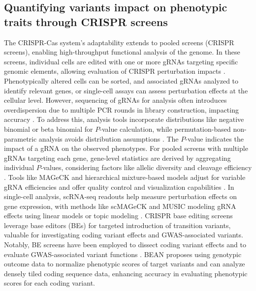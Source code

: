 \documentclass[a4paper, titlepage, openright]{book}
\begin{document}
\subsection{Quantifying variants impact on phenotypic traits through CRISPR screens}
The CRISPR-Cas system's adaptability extends to pooled screens (CRISPR screens), enabling high-throughput functional analysis of the genome. In these screens, individual cells are edited with one or more gRNAs targeting specific genomic elements, allowing evaluation of CRISPR perturbation impacts \citep{doench2018ready}. Phenotypically altered cells can be sorted, and associated gRNAs analyzed to identify relevant genes, or single-cell assays can assess perturbation effects at the cellular level. However, sequencing of gRNAs for analysis often introduces overdispersion due to multiple PCR rounds in library construction, impacting accuracy \citep{clement2020technologies}. To address this, analysis tools incorporate distributions like negative binomial or beta binomial for $P$-value calculation, while permutation-based non-parametric analysis avoids distribution assumptions \citep{spahn2017pinapl,jeong2019beta,jia2017permutation}. The $P$-value indicates the impact of a gRNA on the observed phenotypes. For pooled screens with multiple gRNAs targeting each gene, gene-level statistics are derived by aggregating individual $P$-values, considering factors like allelic diversity and cleavage efficiency \citep{li2014mageck,li2015quality,yu2016screenbeam}. Tools like MAGeCK and hierarchical mixture-based models adjust for variable gRNA efficiencies and offer quality control and visualization capabilities \citep{li2015quality,wang2019integrative}. In single-cell analysis, scRNA-seq readouts help measure perturbation effects on gene expression, with methods like scMAGeCK and MUSIC modeling gRNA effects using linear models or topic modeling \citep{yang2020scmageck,duan2019model}. CRISPR base editing screens leverage base editors (BEs) for targeted introduction of transition variants, valuable for investigating coding variant effects and GWAS-associated variants. Notably, BE screens have been employed to dissect coding variant effects and to evaluate GWAS-associated variant functions \citep{kweon2020crispr, despres2020perturbing,hanna2021massively,cuella2021functional,cheng2021singlehuang2021identification,sanchez2022base,kim2022high,sangree2022benchmarking,morris2023discovery,martin2023massively,pablo2023scanning,coelho2023base,lue2023base,garcia2023base}. BEAN \citep{ryu2023joint} proposes using genotypic outcome data to normalize phenotypic scores of target variants and can analyze densely tiled coding sequence data, enhancing accuracy in evaluating phenotypic scores for each coding variant.
\end{document}
